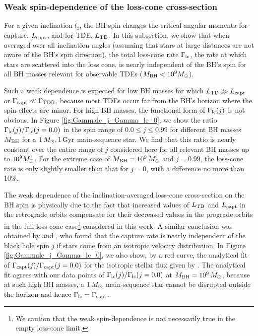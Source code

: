 \documentclass[useAMS,usenatbib]{mn2e}
\def\msun{M_{\rm \odot}}
\def\mBH{M_{\rm BH}}
\def\Lcapt{L_{\rm capt}}
\def\LTD{L_{\rm TD}}
\def\GammaTDE{\Gamma_{\rm TDE}}
\def\Gammacapt{\Gamma_{\rm capt}}
\def\Gammalc{\Gamma_{\rm lc}}
\def\Gyr{{\rm Gyr}}
\begin{document}
\subsubsection{Weak spin-dependence of the loss-cone cross-section}

For a given inclination $l_z$, the BH spin changes the critical angular momenta for capture, $\Lcapt$, and for TDE, $\LTD$. In this subsection, we show that when averaged over all inclination angles (assuming that stars at large distances are not aware of the BH's spin direction), the total loss-cone rate $\Gammalc$, the rate at which stars are scattered into the loss cone, is nearly independent of the BH's spin for all BH masses relevant for observable TDEs ($\mBH< 10^9\msun$). 

Such a weak dependence is expected for low BH masses for which $\LTD\gg \Lcapt$ or $\Gammacapt \ll \GammaTDE$, because most TDEs occur far from the BH's horizon where the spin effects are minor. For high BH masses, the functional form of $\Gammalc(j)$ is not obvious. In Figure \ref{fig:Gammalc_j_Gamma_lc_0}, we show the ratio $\Gammalc(j)/\Gammalc(j=0.0)$ in the spin range of $0.0\le j\le0.99$ for different BH masses $\mBH$ for a $1\,\msun,1\,\Gyr$ main-sequence star. We find that this ratio is nearly constant over the entire range of $j$ considered here for all relevant BH masses up to $10^9\msun$. For the extreme case of $\mBH=10^9\,\msun$ and $j=0.99$, the loss-cone rate is only slightly smaller than that for $j=0$, with a difference no more than 10\%.

The weak dependence of the inclination-averaged loss-cone cross-section on the BH spin is physically due to the fact that increased values of $\LTD$ and $\Lcapt$ in the retrograde orbits compensate for their decreased values in the prograde orbits in the full loss-cone case\footnote{We caution that the weak spin-dependence is not necessarily true in the empty loss-cone limit.} considered in this work. A similar conclusion was obtained by \citet{Young1977} and \citet{Kesden2012}, who found that the capture rate is nearly independent of the black hole spin $j$ if stars come from an isotropic velocity distribution. In Figure \ref{fig:Gammalc_j_Gamma_lc_0}, we also show, by a red curve, the analytical fit of $\Gammacapt(j)/\Gammacapt(j=0.0)$ for the isotropic stellar flux given by \cite{Young1977}. The analytical fit agrees with our data points of $\Gammalc(j)/\Gammalc(j=0.0)$ at $\mBH=10^9\,\msun$, because at such high BH masses, a $1\,\msun$ main-sequence star cannot be disrupted outside the horizon and hence $\Gammalc=\Gammacapt$. 
\end{document}
